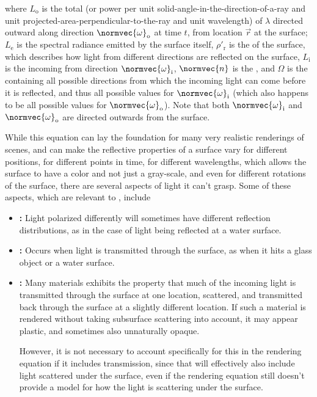 where $L_{\text{o}}$ is the total  (or power per unit solid-angle-in-the-direction-of-a-ray and unit projected-area-perpendicular-to-the-ray and unit wavelength) of  $\lambda$ directed outward along direction $\normvec{\omega}_{\text{o}}$ at time $t$, from location $\vec{r}$ at the surface; $L_{\text{e}}$ is the spectral radiance emitted by the surface itself, $\rho'_{\text{r}}$ is the \BRDF of the surface, which describes how light from different directions are reflected on the surface, $L_{\text{i}}$ is the  incoming from direction $\normvec{\omega}_{\text{i}}$, $\normvec{n}$ is the , and $\Omega$ is the  containing all possible directions from which the incoming light can come before it is reflected, and thus all possible values for $\normvec{\omega}_{\text{i}}$ (which also happens to be all possible values for $\normvec{\omega}_{\text{o}}$). Note that both $\normvec{\omega}_{\text{i}}$ and $\normvec{\omega}_{\text{o}}$ are directed outwards from the surface.

While this equation can lay the foundation for many very realistic renderings of \threedimensional scenes, and can make the reflective properties of a surface vary for different positions, for different points in time, for different wavelengths, which allows the surface to have a color and not just a gray-scale, and even for different rotations of the surface, there are several aspects of light it can't grasp. Some of these aspects, which are relevant to \surfacewaterrendering, include

\begin{itemize}
\item \textbf{:} Light polarized differently will sometimes have different reflection distributions, as in the case of light being reflected at a water surface.

\item \textbf{:} Occurs when light is transmitted through the surface, as when it hits a glass object or a water surface.

\item \textbf{:} Many materials exhibits the property that much of the incoming light is transmitted through the surface at one location, scattered, and transmitted back through the surface at a slightly different location. If such a material is rendered without taking subsurface scattering into account, it may appear plastic, and sometimes also unnaturally opaque.

However, it is not necessary to account specifically for this in the rendering equation if it includes transmission, since that will effectively also include light scattered under the surface, even if the rendering equation still doesn't provide a model for how the light is scattering under the surface.
\end{itemize}

